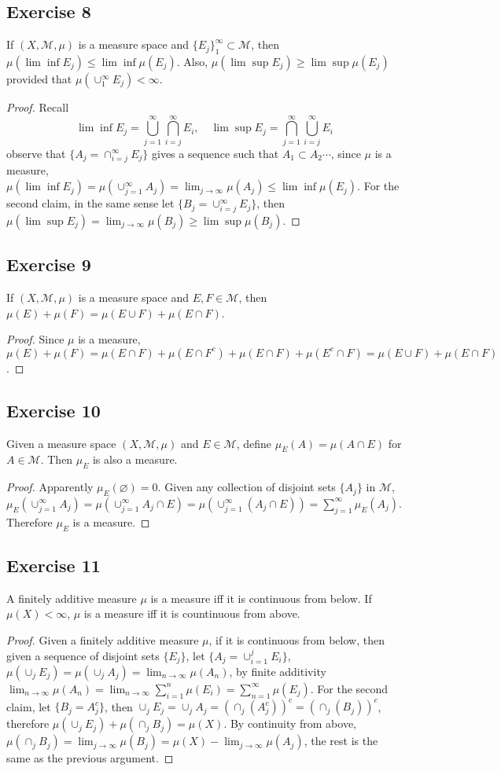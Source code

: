 \subsection*{Exercise 8}
If $(X,\mathcal{M},\mu)$ is a measure space and $\{E_j\}^\infty_1\subset\mathcal{M}$, then $\mu(\lim\inf E_j)\le\lim\inf\mu(E_j)$. Also, $\mu(\lim\sup E_j)\ge\lim\sup\mu(E_j)$ provided that $\mu(\cup^\infty_1E_j)<\infty$.
\begin{proof}
    Recall
    $$
    \lim\inf E_j=\bigcup_{j=1}^\infty\bigcap_{i=j}^\infty E_i,\quad \lim\sup E_j=\bigcap_{j=1}^\infty\bigcup_{i=j}^\infty E_i
    $$
    observe that $\{A_j=\cap^\infty_{i=j}E_j\}$ gives a sequence such that $A_1\subset A_2\cdots$, since $\mu$ is a measure, $\mu(\lim\inf E_j)=\mu(\cup^\infty_{j=1}A_j)=\lim_{j\to\infty}\mu(A_j)\le\lim\inf\mu(E_j)$. For the second claim, in the same sense let $\{B_j=\cup^\infty_{i=j}E_j\}$, then $\mu(\lim\sup E_j)=\lim_{j\to\infty}\mu(B_j)\ge\lim\sup\mu(B_j)$. 
\end{proof}
\subsection*{Exercise 9}
If $(X,\mathcal{M},\mu)$ is a measure space and $E,F\in\mathcal{M}$, then $\mu(E)+\mu(F)=\mu(E\cup F)+\mu(E\cap F)$.
\begin{proof}
    Since $\mu$ is a measure, $\mu(E)+\mu(F)=\mu(E\cap F)+\mu(E\cap F^c)+\mu(E\cap F)+\mu(E^c\cap F)=\mu(E\cup F)+\mu(E\cap F)$.
\end{proof}
\subsection*{Exercise 10}
Given a measure space $(X,\mathcal{M},\mu)$ and $E\in\mathcal{M}$, define $\mu_E(A)=\mu(A\cap E)$ for $A\in\mathcal{M}$. Then $\mu_E$ is also a measure.
\begin{proof}
    Apparently $\mu_E(\varnothing)=0$. Given any collection of disjoint sets $\{A_j\}$ in $\mathcal{M}$, $\mu_E(\cup^\infty_{j=1}A_j)=\mu(\cup^\infty_{j=1}A_j\cap E)=\mu(\cup^\infty_{j=1}(A_j\cap E))=\sum^\infty_{j=1}\mu_E(A_j)$. Therefore $\mu_E$ is a measure.
\end{proof}
\subsection*{Exercise 11}
A finitely additive measure $\mu$ is a measure iff it is continuous from below. If $\mu(X)<\infty$, $\mu$ is a measure iff it is countinuous from above.
\begin{proof}
    Given a finitely additive measure $\mu$, if it is continuous from below, then given a sequence of disjoint sets $\{E_j\}$, let $\{A_j=\cup_{i=1}^j E_i\}$, $\mu(\cup_jE_j)=\mu(\cup_jA_j)=\lim_{n\to\infty}\mu(A_n)$, by finite additivity $\lim_{n\to\infty}\mu(A_n)=\lim_{n\to\infty}\sum_{i=1}^n\mu(E_i)=\sum^\infty_{n=1}\mu(E_j)$. For the second claim, let $\{B_j=A_j^c\}$, then $\cup_j E_j=\cup_j A_j=(\cap_j(A_j^c))^c=(\cap_j(B_j))^c$, therefore $\mu(\cup_jE_j)+\mu(\cap_jB_j)=\mu(X)$. By continuity from above, $\mu(\cap_jB_j)=\lim_{j\to\infty}\mu(B_j)=\mu(X)-\lim_{j\to\infty}\mu(A_j)$, the rest is the same as the previous argument.
\end{proof}
